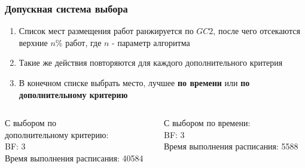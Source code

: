 \begin{frame}
    \frametitle{Допускная система выбора}
    \begin{enumerate}
        \item Список мест размещения работ ранжируется по $GC2$, после чего отсекаются верхние $n\%$ работ, где $n$ - параметр алгоритма
        \item Такие же действия повторяются для каждого дополнительного критерия
        \item В конечном списке выбрать место, лучшее \textbf{по времени} или \textbf{по дополнительному критерию}
    \end{enumerate}
    \begin{columns}
        \begin{column}{0.5\textwidth}
            \begin{center}
                С выбором по\\
                дополнительному критерию:\\
                BF: 3 \\
                Время выполнения расписания: 40584
            \end{center}
        \end{column}
        \begin{column}{0.5\textwidth}
            \begin{center}
                С выбором по времени: \\
                BF: 3 \\
                Время выполнения расписания: 5588
            \end{center}
        \end{column}
    \end{columns}
\end{frame}
